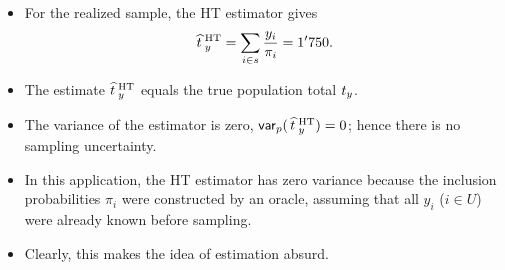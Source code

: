 \documentclass{my_eth_beamer}
\numberwithin{equation}{section}
\begin{document}
\begin{frame}
    \begin{Bsp_forts}[Cont.]
        \vspace{0.25em}
        \begin{itemize}
        \setlength{\itemsep}{8pt}
            \item For the realized sample, the HT estimator gives
                \begin{equation*}
                    \widehat{t}^{\;\mathrm{HT}}_{\;y} = \sum_{i \in s} \frac{y_i}{\pi_i} = 1'750.
                \end{equation*}
            \item The estimate $\widehat{t}^{\;\mathrm{HT}}_{\;y}$ equals the true population total
                $t_y$.
            \item The variance of the estimator is zero,
                $\mathsf{var}_p(\,\widehat{t}^{\;\mathrm{HT}}_{\;y})=0$; hence there is \alert{no sampling
                uncertainty}.
            \item In this application, the HT estimator has zero variance
                because the inclusion probabilities $\pi_i$ were constructed
                by an \alert{oracle}, assuming that all $y_i$ ($i\in U$) were
                already \alert{known before sampling}.
            \item Clearly, this makes the idea of estimation \alert{absurd}.
        \end{itemize}
    \end{Bsp_forts}
\end{frame}
\end{document}
